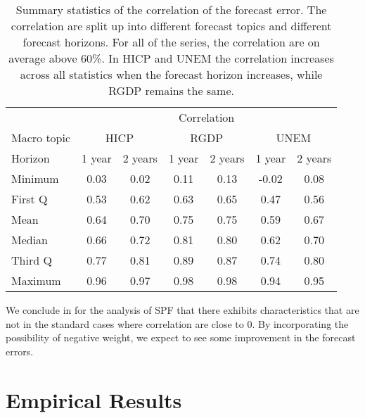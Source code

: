 \documentclass[11pt]{article}
\begin{document}
\begin{table}[!h]
	\centering
	\caption{Summary statistics of the correlation of the forecast error. The correlation are split up into different forecast topics and different forecast horizons. For all of the series, the correlation are on average above 60\%. In HICP and UNEM the correlation increases across all statistics when the forecast horizon increases, while RGDP remains the same.}
	\label{tab: correlation summary statistics}
	\begin{tabular}{lcccccc}%
		\hline
		&\multicolumn{6}{c}{Correlation}\\
		\cmidrule(lr){2-7}
		Macro topic & \multicolumn{2}{c}{HICP} & \multicolumn{2}{c}{RGDP} & \multicolumn{2}{c}{UNEM} \\
		\cmidrule(lr){2-3} \cmidrule(lr){4-5}\cmidrule(lr){6-7}
		Horizon     & 1 year & 2 years & 1 year & 2 years & 1 year & 2 years \\ 
		\hline
		Minimum     & 0.03        & 0.02        & 0.11        & 0.13        & -0.02        & 0.08       \\
		First Q     & 0.53        & 0.62        & 0.63        & 0.65        & 0.47         & 0.56       \\
		Mean        & 0.64        & 0.70        & 0.75        & 0.75        & 0.59         & 0.67       \\
		Median      & 0.66        & 0.72        & 0.81        & 0.80        & 0.62         & 0.70       \\
		Third Q     & 0.77        & 0.81        & 0.89        & 0.87        & 0.74         & 0.80       \\
		Maximum     & 0.96        & 0.97        & 0.98        & 0.98        & 0.94         & 0.95       \\ 
		\hline
	\end{tabular}
\end{table}



We conclude in for the analysis of SPF that there exhibits
characteristics that are not in the standard cases where correlation are close to 0. By incorporating the
possibility of negative weight, we expect to see some improvement in the
forecast errors.

\section{Empirical Results}\label{empirical-results}
\end{document}
